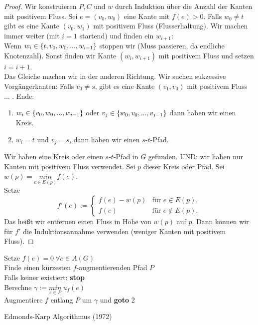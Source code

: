 \begin{proof}
	Wir konstruieren $P, C$ und $w$ durch Induktion über die Anzahl der Kanten mit positivem Fluss. Sei $e=(v_0, w_0)$ eine Kante mit $f(e)>0$. Falls $w_0\neq t$ gibt es eine Kante $(v_0, w_1)$ mit positivem Fluss (Flusserhaltung). Wir machen immer weiter (mit $i=1$ startend) und finden ein $w_{i+1}$:\\
	Wenn $w_i\in \{t, v_0, w_0, ..., w_{i-1}\}$ stoppen wir (Muss passieren, da endliche Knotenzahl). Sonst finden wir Kante $(w_i, w_{i+1})$ mit positivem Fluss und setzen $i = i+1$.\\
	Das Gleiche machen wir in der anderen Richtung. Wir suchen sukzessive Vorgängerkanten: Falls $v_0 \neq s$, gibt es eine Kante $(v_1, v_0)$ mit positivem Fluss ... . Ende:
	\begin{enumerate}[label=\arabic*)]
		\item $w_i\in \{v_0, w_0, ..., w_{i-1}\}$ oder $v_j \in \{w_0, v_0, ..., v_{j-1}\}$ dann haben wir einen Kreis.
		\item $w_i=t$ und $v_j=s$, dann haben wir einen $s$-$t$-Pfad.
	\end{enumerate}
	Wir haben eine Kreis oder einen $s$-$t$-Pfad in $G$ gefunden. UND: wir haben nur Kanten mit positivem Fluss verwendet. Sei $p$ dieser Kreis oder Pfad. Sei $w(p) = \underset{e\in E(p)}{min}f(e)$.\\
	Setze \[f'(e):=\begin{cases}
		f(e) - w(p) &\text{für } e\in E(p),\\
		f(e) &\text{für } e\notin E(p).
	\end{cases}\]
	Das heißt wir entfernen einen Fluss in Höhe von $w(p)$ auf $p$. Dann können wir für $f'$ die Induktionsannahme verwenden (weniger Kanten mit positivem Fluss).
\end{proof}
\newpage
\begin{algorithm}
	\vspace*{5pt}
	Setze $f(e)=0~\forall e\in A(G)$\\
	Finde einen kürzesten $f$-augmentierenden Pfad $P$\\
	\hspace*{15pt}Falls keiner existiert: \textbf{stop} \\
	Berechne $\gamma := \underset{e\in P}{min}~ u_f(e)$\\
	\hspace*{15pt}Augmentiere $f$ entlang $P$ um $\gamma$ und \textbf{goto} 2
	\caption{Edmonds-Karp Algorithmus (1972)}
	\label{fig:Algorithmus}
\end{algorithm}
